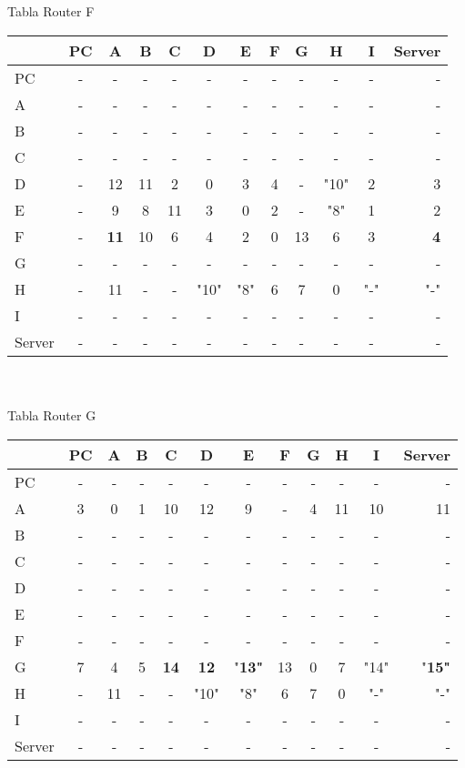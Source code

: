 \documentclass{article}
\begin{document}
\\
\\
Tabla Router F \\
\begin{tabular}{l*{10}{c}r}
              & PC & A & B & C & D & E & F & G & H & I & Server \\
\hline
PC             & - & - & - & - & - & - & - & - & - & - & -\\
A              & - & - & - & - & - & - & - & - & - & - & -\\
B              & - & - & - & - & - & - & - & - & - & - & -\\
C              & - & - & - & - & - & - & - & - & - & - & -\\
D              & - & 12 & 11 & 2 & 0 & 3 & 4 & - & "10" & 2 & 3\\
E              & - & 9 & 8 & 11 & 3 & 0 & 2 & - & "8" & 1 & 2\\
F              & - &\bf{11}& 10 & 6 & 4 & 2 & 0 & 13 & 6 & 3 &\bf{4}\\
G              & - & - & - & - & - & - & - & - & - & - & -\\
H              & - & 11 & - & - & "10" & "8" & 6 & 7 & 0 & "-" & "-"\\
I              & - & - & - & - & - & - & - & - & - & - & -\\
Server         & - & - & - & - & - & - & - & - & - & - & -\\

\end{tabular}
\\
\\
Tabla Router G \\
\begin{tabular}{l*{10}{c}r}
              & PC & A & B & C & D & E & F & G & H & I & Server \\
\hline
PC             & - & - & - & - & - & - & - & - & - & - & -\\
A              & 3 & 0 & 1 & 10 & 12 & 9 & - & 4 & 11 & 10 & 11 \\
B              & - & - & - & - & - & - & - & - & - & - & -\\
C              & - & - & - & - & - & - & - & - & - & - & -\\
D              & - & - & - & - & - & - & - & - & - & - & -\\
E              & - & - & - & - & - & - & - & - & - & - & -\\
F              & - & - & - & - & - & - & - & - & - & - & -\\
G              & 7 & 4 & 5 &\bf{14}&\bf{12}&"\bf{13}"& 13 & 0 & 7 & "14" &"\bf{15}"\\
H              & - & 11 & - & - & "10" & "8" & 6 & 7 & 0 & "-" & "-"\\
I              & - & - & - & - & - & - & - & - & - & - & -\\
Server         & - & - & - & - & - & - & - & - & - & - & -\\

\end{tabular}
\end{document}
